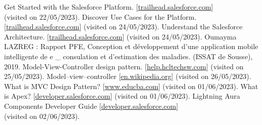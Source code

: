 \documentclass[12pt, oneside, a4paper]{enis-pfe-report}
\begin{document}
  \begin{thebibliography}{9}
Get Started with the Salesforce Platform.
[\href{https://trailhead.salesforce.com/content/learn/modules/starting_force_com/starting_intro}{trailhead.salesforce.com}]
\\(visited on 22/05/2023).
Discover Use Cases for the Platform.
[\href{https://trailhead.salesforce.com/content/learn/modules/starting_force_com/starting_discovering}{trailhead.salesforce.com}]
(visited on 24/05/2023).
Understand the Salesforce Architecture.
[\href{https://trailhead.salesforce.com/content/learn/modules/starting_force_com/starting_understanding_arch}{trailhead.salesforce.com}]
(visited on 24/05/2023).
Oumayma LAZREG : Rapport PFE, Conception et développement
d'une application mobile
intelligente de e \_ consulation et
d'estimation des maladies.
(ISSAT de Sousse), 2019.
Model-View-Controller design pattern.
[\href{https://help.hcltechsw.com/commerce/9.1.0/developer/concepts/csdmvcdespat.html}{help.hcltechsw.com}]
(visited on 25/05/2023).
Model–view–controller
[\href{https://en.wikipedia.org/wiki/Model-view-controller}{en.wikipedia.org}]
(visited on 26/05/2023).
What is MVC Design Pattern?
[\href{https://www.educba.com/what-is-mvc-design-pattern/}{www.educba.com}]
(visited on 01/06/2023).
What is Apex?
[\href{https://developer.salesforce.com/docs/atlas.en-us.apexcode.meta/apexcode/apex_intro_what_is_apex.htm}{developer.salesforce.com}]
(visited on 01/06/2023).
Lightning Aura Components Developer Guide
[\href{https://developer.salesforce.com/docs/atlas.en-us.lightning.meta/lightning/intro_components.htm}{developer.salesforce.com}]
\\(visited on 02/06/2023).





\end{thebibliography}
\end{document}
